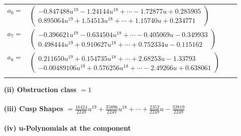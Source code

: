 \documentclass[1p]{elsarticle_modified}
\theoremstyle{definition}
\begin{document}
\begin{tabular}{m{7pt} m{180pt} m{7pt} m{180pt} }
\flushright $a_{6}=$&$\begin{pmatrix}-0.847488 u^{19}-1.24144 u^{18}+\cdots-1.72877 u+0.285905\\0.895064 u^{19}+1.54513 u^{18}+\cdots+1.15740 u+0.234771\end{pmatrix}$ \\
\flushright $a_{7}=$&$\begin{pmatrix}-0.396621 u^{19}-0.634504 u^{18}+\cdots-0.405069 u-0.349933\\0.498444 u^{19}+0.910627 u^{18}+\cdots+0.752334 u-0.115162\end{pmatrix}$ \\
\flushright $a_{8}=$&$\begin{pmatrix}0.211650 u^{19}+0.154735 u^{18}+\cdots+2.68253 u-1.33793\\-0.00489106 u^{19}+0.576256 u^{18}+\cdots-2.49266 u+0.638061\end{pmatrix}$\\&\end{tabular}
\flushleft \textbf{(ii) Obstruction class $= 1$}\\~\\
\flushleft \textbf{(iii) Cusp Shapes $= \frac{16424}{2249} u^{19}+\frac{35896}{2249} u^{18}+\cdots+\frac{2352}{2249} u-\frac{32819}{2249}$}\\~\\
\newpage\renewcommand{\arraystretch}{1}
\flushleft \textbf{(iv) u-Polynomials at the component}\newline \\
\end{document}
